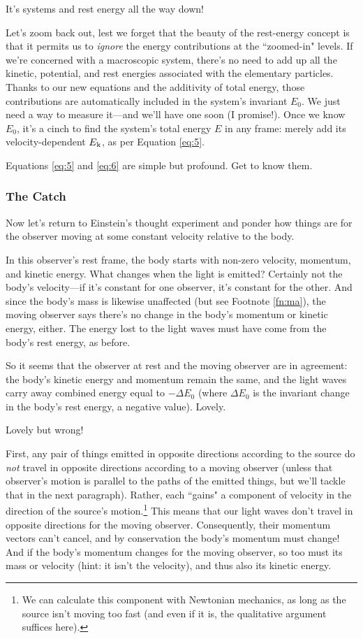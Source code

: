 \documentclass[12pt]{article}
\begin{document}
It's systems and rest energy all the way down!

Let's zoom back out, lest we forget that the beauty of the rest-energy concept is that it permits us to \emph{ignore} the energy contributions at the ``zoomed-in" levels. If we're concerned with a macroscopic system, there's no need to add up all the kinetic, potential, and rest energies associated with the elementary particles. Thanks to our new equations and the additivity of total energy, those contributions are automatically included in the system's invariant $E_0$. We just need a way to measure it---and we'll have one soon (I promise!). Once we know $E_0$, it's a cinch to find the system's total energy $E$ in any frame: merely add its velocity-dependent $E_{\mkern.5mu \textrm{k}}$, as per Equation \ref{eq:5}.

Equations \ref{eq:5} and \ref{eq:6} are simple but profound. Get to know them.

\subsubsection{The Catch}\label{sssec:tc}

Now let's return to Einstein's thought experiment and ponder how things are for the observer moving at some constant velocity relative to the body.

In this observer's rest frame, the body starts with non-zero velocity, momentum, and kinetic energy. What changes when the light is emitted? Certainly not the body's velocity---if it's constant for one observer, it's constant for the other. And since the body's mass is likewise unaffected (but see Footnote \ref{fn:ma}), the moving observer says there's no change in the body's momentum or kinetic energy, either. The energy lost to the light waves must have come from the body's rest energy, as before.

So it seems that the observer at rest and the moving observer are in agreement: the body's kinetic energy and momentum remain the same, and the light waves carry away combined energy equal to $-\Delta E_0$ (where $\Delta E_0$ is the invariant change in the body's rest energy, a negative value). Lovely.

Lovely but wrong!

First, any pair of things emitted in opposite directions according to the source do \emph{not} travel in opposite directions according to a moving observer (unless that observer's motion is parallel to the paths of the emitted things, but we'll tackle that in the next paragraph). Rather, each ``gains" a component of velocity in the direction of the source's motion.\footnote{We can calculate this component with Newtonian mechanics, as long as the source isn't moving too fast (and even if it is, the qualitative argument suffices here).} This means that our light waves don't travel in opposite directions for the moving observer. Consequently, their momentum vectors can't cancel, and by conservation the body's momentum must change! And if the body's momentum changes for the moving observer, so too must its mass or velocity (hint: it isn't the velocity), and thus also its kinetic energy.
\end{document}
